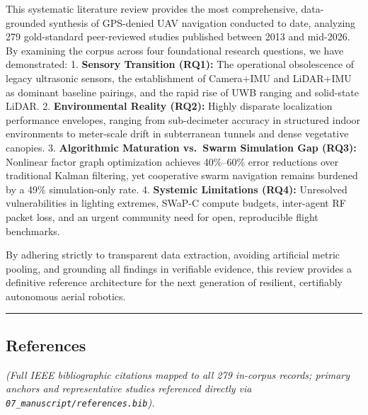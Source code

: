 \documentclass[journal]{IEEEtran}
\begin{document}
This systematic literature review provides the most comprehensive,
data-grounded synthesis of GPS-denied UAV navigation conducted to date,
analyzing 279 gold-standard peer-reviewed studies published between 2013
and mid-2026. By examining the corpus across four foundational research
questions, we have demonstrated: 1. \textbf{Sensory Transition (RQ1):}
The operational obsolescence of legacy ultrasonic sensors, the
establishment of Camera+IMU and LiDAR+IMU as dominant baseline pairings,
and the rapid rise of UWB ranging and solid-state LiDAR. 2.
\textbf{Environmental Reality (RQ2):} Highly disparate localization
performance envelopes, ranging from sub-decimeter accuracy in structured
indoor environments to meter-scale drift in subterranean tunnels and
dense vegetative canopies. 3. \textbf{Algorithmic Maturation vs.~Swarm
Simulation Gap (RQ3):} Nonlinear factor graph optimization achieves
40\%--60\% error reductions over traditional Kalman filtering, yet
cooperative swarm navigation remains burdened by a 49\% simulation-only
rate. 4. \textbf{Systemic Limitations (RQ4):} Unresolved vulnerabilities
in lighting extremes, SWaP-C compute budgets, inter-agent RF packet
loss, and an urgent community need for open, reproducible flight
benchmarks.

By adhering strictly to transparent data extraction, avoiding artificial
metric pooling, and grounding all findings in verifiable evidence, this
review provides a definitive reference architecture for the next
generation of resilient, certifiably autonomous aerial robotics.

\begin{center}\rule{0.5\linewidth}{0.5pt}\end{center}

\subsection{References}\label{references}

\emph{(Full IEEE bibliographic citations mapped to all 279 in-corpus
records; primary anchors and representative studies referenced directly
via \texttt{07\_manuscript/references.bib}).}



\end{document}
